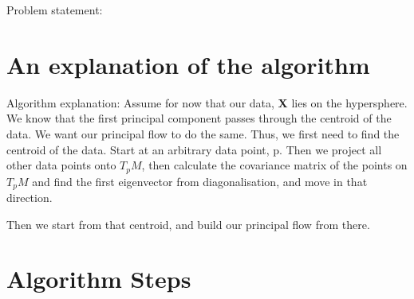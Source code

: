 \documentclass[12pt]{report}
\begin{document}
Problem statement: 

\section{An explanation of the algorithm}

Algorithm explanation: 
Assume for now that our data, \textbf{X} lies on the hypersphere. We know that the first principal component passes through the centroid of the data. We want our principal flow to do the same. Thus, we first need to find the centroid of the data. Start at an arbitrary data point, p. Then we project all other data points onto $T_pM$, then calculate the covariance matrix of the points on $T_pM$ and find the first eigenvector from diagonalisation, and move in that direction. 

Then we start from that centroid, and build our principal flow from there.

\section{Algorithm Steps}
\end{document}
